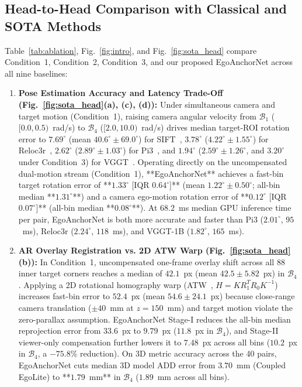 \documentclass[journal]{IEEEtran}
\begin{document}
\subsection{Head-to-Head Comparison with Classical and SOTA Methods}
Table~\ref{tab:ablation}, Fig.~\ref{fig:intro}, and Fig.~\ref{fig:sota_head} compare Condition~1, Condition~2, Condition~3, and our proposed EgoAnchorNet across all nine baselines:
\begin{enumerate}
    \item \textbf{Pose Estimation Accuracy and Latency Trade-Off (Fig.~\ref{fig:sota_head}(a), (c), (d)):} Under simultaneous camera and target motion (Condition~1), raising camera angular velocity from $\mathcal{B}_1$ ($[0.0,0.5)$~rad/s) to $\mathcal{B}_4$ ($[2.0,10.0)$~rad/s) drives median target-ROI rotation error to $7.69^\circ$ (mean $40.6^\circ \pm 69.0^\circ$) for SIFT~\cite{lowe2004distinctive}, $3.78^\circ$ ($4.22^\circ \pm 1.55^\circ$) for Reloc3r~\cite{dong2025reloc3r}, $2.62^\circ$ ($2.89^\circ \pm 1.03^\circ$) for Pi3~\cite{wang2025pi3}, and $1.94^\circ$ ($2.59^\circ \pm 1.26^\circ$, and $3.20^\circ$ under Condition~3) for VGGT~\cite{wang2025vggt}. Operating directly on the uncompensated dual-motion stream (Condition~1), **EgoAnchorNet** achieves a fast-bin target rotation error of **$1.33^\circ$ [IQR $0.64^\circ$]** (mean $1.22^\circ \pm 0.50^\circ$; all-bin median **$1.31^\circ$**) and a camera ego-motion rotation error of **$0.12^\circ$ [IQR $0.07^\circ$]** (all-bin median **$0.08^\circ$**). At $68.2$~ms median GPU inference time per pair, EgoAnchorNet is both more accurate and faster than Pi3 ($2.01^\circ$, $95$~ms), Reloc3r ($2.24^\circ$, $118$~ms), and VGGT-1B ($1.82^\circ$, $165$~ms).
    \item \textbf{AR Overlay Registration vs. 2D ATW Warp (Fig.~\ref{fig:sota_head}(b)):} In Condition~1, uncompensated one-frame overlay shift across all 88 inner target corners reaches a median of $42.1$~px (mean $42.5 \pm 5.82$~px) in $\mathcal{B}_4$. Applying a 2D rotational homography warp (ATW~\cite{lu2025quasar,gao2025xrgo}, $H = K R_{1}^T R_{0} K^{-1}$) increases fast-bin error to $52.4$~px (mean $54.6 \pm 24.1$~px) because close-range camera translation ($\pm 40$~mm at $z = 150$~mm) and target motion violate the zero-parallax assumption. EgoAnchorNet Stage-I reduces the all-bin median reprojection error from $33.6$~px to $9.79$~px ($11.8$~px in $\mathcal{B}_4$), and Stage-II viewer-only compensation further lowers it to $7.48$~px across all bins ($10.2$~px in $\mathcal{B}_4$, a $-75.8\%$ reduction). On 3D metric accuracy across the 40 pairs, EgoAnchorNet cuts median 3D model ADD error from $3.70$~mm (Coupled EgoLite) to **$1.79$~mm** in $\mathcal{B}_4$ ($1.89$~mm across all bins).

\end{enumerate}
\end{document}
